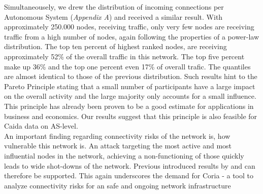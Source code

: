 \documentclass[conference, 11pt]{IEEEtran}
\begin{document}

Simultaneousely, we drew the distribution of incoming connections per Autonomous System (\textit{Appendix A}) and received a similar result. With approximately 250.000 nodes, receiving traffic, only very few nodes are receiving traffic from a high number of nodes, again following the properties of a power-law distribution. The top ten percent of highest ranked nodes, are receiving approximately 52\% of the overall traffic in this network. The top five percent make up 36\% and the top one percent even 17\% of overall trafic. The quantiles are almost identical to those of the previous distribution. Such results hint to the Pareto Principle stating that a small number of participants have a large impact on the overall activity and the large majority only accounts for a small influence. This principle has already been proven to be a good estimate for applications in business and economics. Our results suggest that this principle is also feasible for Caida data on AS-level.  \\ 



 


An important finding regarding connectivity risks of the network is, how vulnerable this network is. An attack targeting the most active and most influential nodes in the network, achieving a non-functioning of those quickly leads to wide shot-downs of the network. Previous introduced results by \cite{powerlawCitation} and \cite{owningInternet} can therefore be supported.  This again underscores the demand for Coria - a tool to analyze connectivity risks for an safe and ongoing network infrastructure 
\end{document}
